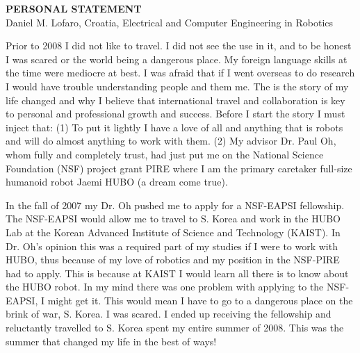 \documentclass[12pt]{article}
\begin{document}
\begin{center}
\textbf{PERSONAL STATEMENT}\\
Daniel M. Lofaro, Croatia, Electrical and Computer Engineering in Robotics\\

\end{center}

\normalsize
Prior to 2008 I did not like to travel. 
I did not see the use in it, and to be honest I was scared or the world being a dangerous place.  
My foreign language skills at the time were mediocre at best.  
I was afraid that if I went overseas to do research I would have trouble understanding people and them me.  
The is the story of my life changed and why I believe that international travel and collaboration is key to personal and professional growth and success.
Before I start the story I must inject that: 
(1) To put it lightly I have a love of all and anything that is robots and will do almost anything to work with them.  
(2) My advisor Dr. Paul Oh, whom fully and completely trust, had just put me on the National Science Foundation (NSF) project grant PIRE where I am the primary caretaker full-size humanoid robot Jaemi HUBO (a dream come true).  

In the fall of 2007 my Dr. Oh pushed me to apply for a NSF-EAPSI fellowship.  
The NSF-EAPSI would allow me to travel to S. Korea and work in the HUBO Lab at the Korean Advanced Institute of Science and Technology (KAIST).  
In Dr. Oh's opinion this was a required part of my studies if I were to work with HUBO, thus because of my love of robotics and my position in the NSF-PIRE had to apply.
This is because at KAIST I would learn all there is to know about the HUBO robot.
In my mind there was one problem with applying to the NSF-EAPSI, I might get it.
This would mean I have to go to a dangerous place on the brink of war, S. Korea.
I was scared.  
I ended up receiving the fellowship and reluctantly travelled to S. Korea spent my entire summer of 2008.  
This was the summer that changed my life in the best of ways!  

\end{document}
